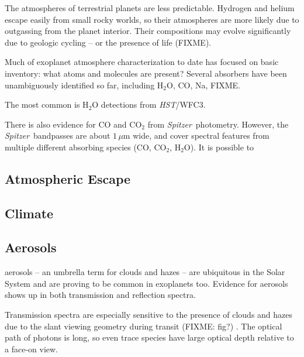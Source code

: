 \documentclass[graybox,natbib,nosecnum]{svmult}
\newcommand{\project}[1]{\textsl{#1}}
\newcommand{\HST}{\project{HST}}
\newcommand{\Spitzer}{\project{Spitzer}}
\begin{document}
The atmospheres of terrestrial planets are less predictable. Hydrogen and helium escape easily from small rocky worlds, so their atmospheres are more likely due to outgassing from the planet interior. Their compositions may evolve significantly due to geologic cycling -- or the presence of life (FIXME). 

Much of exoplanet atmosphere characterization to date has focused on basic inventory: what atoms and molecules are present?  Several absorbers have been unambiguously identified so far, including H$_2$O, CO, Na, FIXME. 

The most common is H$_2$O detections from \HST/WFC3.

There is also evidence for CO and CO$_2$ from \Spitzer\ photometry. However, the \Spitzer\ bandpasses are about $1\,\mu$m wide, and cover spectral features from multiple different absorbing species (CO, CO$_2$, H$_2$O). It is possible to   




\subsection{Atmospheric Escape}
\subsection{Climate}

\subsection{Aerosols}
aerosols -- an umbrella term for clouds and hazes -- are ubiquitous in the Solar System and are proving to be common in exoplanets too. Evidence for aerosols shows up in both transmission and reflection spectra.

Transmission spectra are especially sensitive to the presence of clouds and hazes due to the slant viewing geometry during transit (FIXME: fig?) \citep{fortney05}. The optical path of photons is long, so even trace species have large optical depth relative to a face-on view. 
\end{document}
